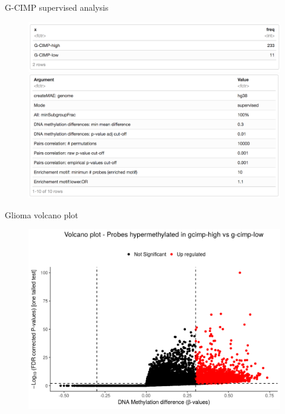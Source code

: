 \documentclass[slidestop,compress,11pt,xcolor=dvipsnames]{beamer}
\begin{document}
\begin{frame}{G-CIMP supervised analysis}

 \begin{figure}[ht!]
  \centering
  \includegraphics[width=1.0\textwidth]{glioma/groups.png}
  \includegraphics[width=1.0\textwidth]{glioma/arguments.png}
 \end{figure}
\end{frame}


\begin{frame}{Glioma volcano plot}
\vspace{-0.5cm}
 \begin{figure}[ht!]
  \centering
  \includegraphics[width=1.0\textwidth]{glioma/volcano.png}
  \caption{}
 \end{figure}
\end{frame}
\end{document}
